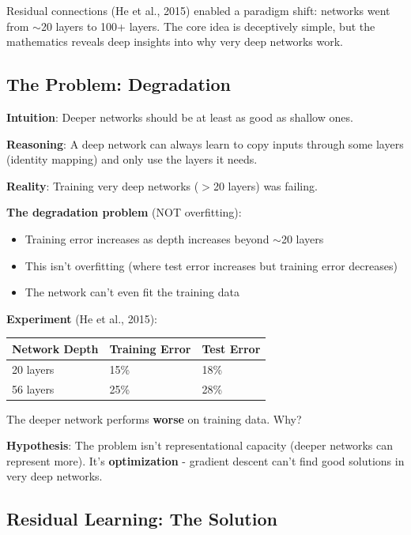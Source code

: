 Residual connections (He et al., 2015) enabled a paradigm shift: networks went from $\sim$20 layers to 100+ layers. The core idea is deceptively simple, but the mathematics reveals deep insights into why very deep networks work.

\subsection{The Problem: Degradation}

\textbf{Intuition}: Deeper networks should be at least as good as shallow ones.

\textbf{Reasoning}: A deep network can always learn to copy inputs through some layers (identity mapping) and only use the layers it needs.

\textbf{Reality}: Training very deep networks ($>$20 layers) was failing.

\textbf{The degradation problem} (NOT overfitting):
\begin{itemize}
\item Training error increases as depth increases beyond $\sim$20 layers
\item This isn't overfitting (where test error increases but training error decreases)
\item The network can't even fit the training data
\end{itemize}

\textbf{Experiment} (He et al., 2015):

\begin{table}[h]
\centering
\begin{tabular}{lll}
\toprule
\textbf{Network Depth} & \textbf{Training Error} & \textbf{Test Error} \\
\midrule
20 layers & 15\% & 18\% \\
56 layers & 25\% & 28\% \\
\bottomrule
\end{tabular}
\end{table}

The deeper network performs \textbf{worse} on training data. Why?

\textbf{Hypothesis}: The problem isn't representational capacity (deeper networks can represent more). It's \textbf{optimization} - gradient descent can't find good solutions in very deep networks.

\subsection{Residual Learning: The Solution}


